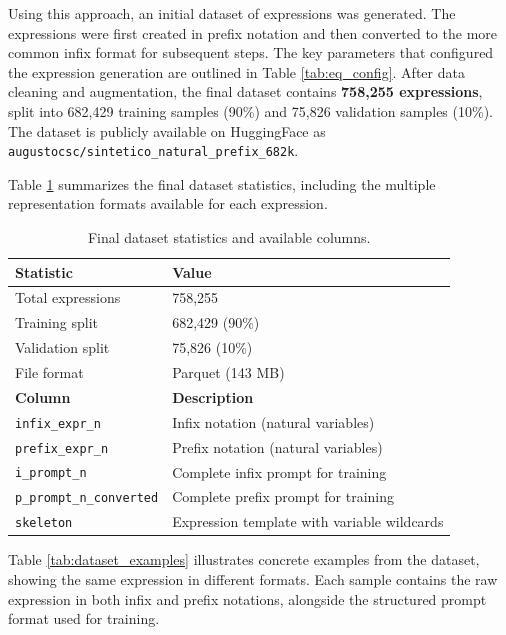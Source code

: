 Using this approach, an initial dataset of expressions was generated. The expressions were first created in prefix notation and then converted to the more common infix format for subsequent steps. The key parameters that configured the expression generation are outlined in Table \ref{tab:eq_config}. After data cleaning and augmentation, the final dataset contains \textbf{758,255 expressions}, split into 682,429 training samples (90\%) and 75,826 validation samples (10\%). The dataset is publicly available on HuggingFace as \texttt{augustocsc/sintetico\_natural\_prefix\_682k}.

Table \ref{tab:dataset_stats} summarizes the final dataset statistics, including the multiple representation formats available for each expression.

\begin{table}[h!]
    \centering
    \caption{Final dataset statistics and available columns.}
    \label{tab:dataset_stats}
    \begin{tabular}{ll}
    \toprule
    \textbf{Statistic} & \textbf{Value} \\
    \midrule
    Total expressions & 758,255 \\
    Training split & 682,429 (90\%) \\
    Validation split & 75,826 (10\%) \\
    File format & Parquet (143 MB) \\
    \midrule
    \textbf{Column} & \textbf{Description} \\
    \midrule
    \texttt{infix\_expr\_n} & Infix notation (natural variables) \\
    \texttt{prefix\_expr\_n} & Prefix notation (natural variables) \\
    \texttt{i\_prompt\_n} & Complete infix prompt for training \\
    \texttt{p\_prompt\_n\_converted} & Complete prefix prompt for training \\
    \texttt{skeleton} & Expression template with variable wildcards \\
    \bottomrule
    \end{tabular}
\end{table}

Table \ref{tab:dataset_examples} illustrates concrete examples from the dataset, showing the same expression in different formats. Each sample contains the raw expression in both infix and prefix notations, alongside the structured prompt format used for training.

